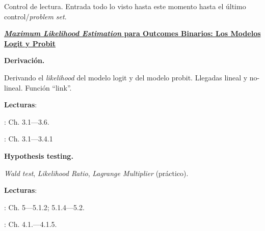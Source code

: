 \documentclass[letterpaper]{article}
\renewenvironment{itemize}{
  \begin{list}{}{
    \setlength{\leftmargin}{1.5em}
  }
}{
  \end{list}
}
\begin{document}
\begin{enumerate}[label=\roman*.]
\item[{\color{red}\Pointinghand}] Control de lectura. Entrada todo lo visto hasta este momento hasta el \'ultimo control/\emph{problem set}.


\item {\bf {\color{ForestGreen}\underline{\emph{Maximum Likelihood Estimation} para Outcomes Binarios: Los Modelos Logit y Probit}}}


        \begin{itemize} 
        \item[11.] {\bf Derivaci\'on.}
        \begin{itemize} 
          \item[$\circ$] Derivando el \emph{likelihood} del modelo logit y del modelo probit. Llegadas lineal y no-lineal. Funci\'on ``link''.
          \item[$\circ$] {\bf Lecturas}: 
            \begin{itemize} 
              \item[$\diamond$] \textcite{Long2001}: Ch. 3.1---3.6.
              \item[$\diamond$] \textcite{Ward2018}: Ch. 3.1---3.4.1
            \end{itemize}
        \end{itemize}
      \end{itemize}

     
       \begin{itemize} 
        \item[12.] {\bf Hypothesis testing.}
        \begin{itemize} 
          \item[$\circ$] \emph{} \emph{Wald test}, \emph{Likelihood Ratio}, \emph{Lagrange Multiplier} (pr\'actico).
          \item[$\circ$] {\bf Lecturas}: 
            \begin{itemize} 
              \item[$\diamond$] \textcite{Ward2018}: Ch. 5---5.1.2; 5.1.4---5.2.
              \item[$\diamond$] \textcite{Long2001}: Ch. 4.1.---4.1.5.
            \end{itemize}
        \end{itemize}
      \end{itemize}



\end{enumerate}
\end{document}
